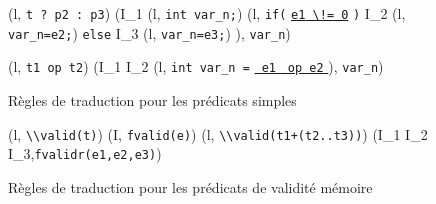 \begin{figure*}[bt]
{    {
      {
        (l, \mbox{\lstinline't ? p2 : p3'}) 
        (I_1 \concat (l, \mbox{\lstinline'int var_n;'})
        \concat (l,  \mbox{\lstinline'if('}
        \underline{\mbox{\lstinline'e1'}\Zclear \mbox{\lstinline' \!= 0'}}
        \mbox{\lstinline')'} \bopen
        I_2 \concat (l, \mbox{\lstinline'var_n=e2;'}) \bclose
        \mbox{\lstinline'else'} \bopen
        I_3 \concat (l, \mbox{\lstinline'var_n=e3;'}) \bclose),
        \mbox{\lstinline'var_n'})
      }
    }

    {
      {(l, \mbox{\lstinline't1 op t2'}) 
        (I_1 \concat I_2 \concat (l,
        \mbox{\lstinline'int var_n ='}
        \underline{\mbox{\lstinline' e1'} \Zclear \mbox{\lstinline' op e2'}
          \Zclear}
        \semicolon
        ), \mbox{\lstinline'var_n'})}
    }
  }
  \caption{Règles de traduction pour les prédicats simples}
  \label{fig:pred-logic}
\end{figure*}

\begin{figure*}[bt]
  \scriptsize{
    {
      {(l, \mbox{\lstinline'\\valid(t)'}) 
        (I, \mbox{\lstinline'fvalid(e)'})
      }
    }
    { {
        (l, \mbox{\lstinline'\\valid(t1+(t2..t3))'}) 
        (I_1 \concat I_2 \concat I_3,\mbox{\lstinline'fvalidr(e1,e2,e3)'})
      }
    }
  }
  \caption{Règles de traduction pour les prédicats de validité mémoire}
  \label{fig:valid}
\end{figure*}

